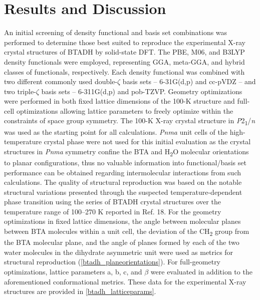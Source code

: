 \section{Results and Discussion}
An initial screening of density functional and basis set combinations was performed to determine those best suited to reproduce the experimental X-ray crystal structures of BTADH by solid-state DFT. The PBE, M06, and B3LYP density functionals were employed, representing GGA, meta-GGA, and hybrid classes of functionals, respectively. Each density functional was combined with two different commonly used double-\(\zeta\) basis sets – 6-31G(d,p) and cc-pVDZ – and two triple-\(\zeta\) basis sets – 6-311G(d,p) and pob-TZVP. Geometry optimizations were performed in both fixed lattice dimensions of the 100-K structure and full-cell optimizations allowing lattice parameters to freely optimize within the constraints of space group symmetry. The 100-K X-ray crystal structure in \textit{P}2\textsubscript{1}/\textit{n} was used as the starting point for all calculations. \textit{Pnma} unit cells of the high-temperature crystal phase were not used for this initial evaluation as the crystal structures in \textit{Pnma} symmetry confine the BTA and H\textsubscript{2}O molecular orientations to planar configurations, thus no valuable information into functional/basis set performance can be obtained regarding intermolecular interactions from such calculations. The quality of structural reproduction was based on the notable structural variations presented through the suspected temperature-dependent phase transition using the series of BTADH crystal structures over the temperature range of 100–270 K reported in Ref. 18. For the geometry optimizations in fixed lattice dimensions, the angle between molecular planes between BTA molecules within a unit cell, the deviation of the CH\textsubscript{2} group from the BTA molecular plane, and the angle of planes formed by each of the two water molecules in the dihydrate asymmetric unit were used as metrics for structural reproduction (\autoref{btadh_planeorientations}). For full-geometry optimizations, lattice parameters a, b, c, and \(\beta\) were evaluated in addition to the aforementioned conformational metrics. These data for the experimental X-ray structures are provided in \autoref{btadh_latticeparams}.

